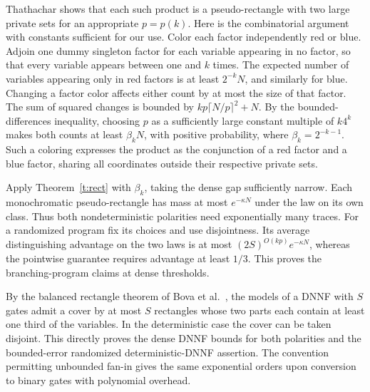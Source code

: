 \documentclass[11pt]{article}
\begin{document}
Thathachar \cite[Lemma~4]{thatha} shows that each such product is a pseudo-rectangle with two large private sets for an appropriate $p=p(k)$. Here is the combinatorial argument with constants sufficient for our use. Color each factor independently red or blue. Adjoin one dummy singleton factor for each variable appearing in no factor, so that every variable appears between one and $k$ times. The expected number of variables appearing only in red factors is at least $2^{-k}N$, and similarly for blue. Changing a factor color affects either count by at most the size of that factor. The sum of squared changes is bounded by $kp\lceil N/p\rceil^2+N$. By the bounded-differences inequality, choosing $p$ as a sufficiently large constant multiple of $k4^k$ makes both counts at least $\beta_k N$, with positive probability, where $\beta_k=2^{-k-1}$. Such a coloring expresses the product as the conjunction of a red factor and a blue factor, sharing all coordinates outside their respective private sets.



Apply Theorem~\ref{t:rect} with $\beta_k$, taking the dense gap sufficiently narrow. Each monochromatic pseudo-rectangle has mass at most $e^{-\kappa N}$ under the law on its own class. Thus both nondeterministic polarities need exponentially many traces. For a randomized program fix its choices and use disjointness. Its average distinguishing advantage on the two laws is at most $(2S)^{O(kp)}e^{-\kappa N}$, whereas the pointwise guarantee requires advantage at least $1/3$. This proves the branching-program claims at dense thresholds.

By the balanced rectangle theorem of Bova et al.\ \cite[Theorem~6]{bcms}, the models of a DNNF with $S$ gates admit a cover by at most $S$ rectangles whose two parts each contain at least one third of the variables. In the deterministic case the cover can be taken disjoint. This directly proves the dense DNNF bounds for both polarities and the bounded-error randomized deterministic-DNNF assertion. The convention permitting unbounded fan-in gives the same exponential orders upon conversion to binary gates with polynomial overhead.
\end{document}
